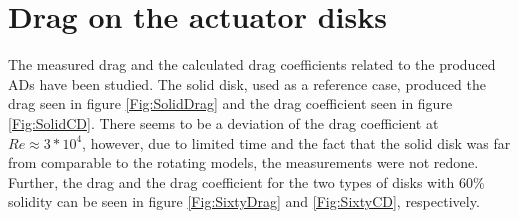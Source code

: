 \section{Drag on the actuator disks}

The measured drag and the calculated drag coefficients related to the produced \gls{AD}s have been studied. The solid disk, used as a reference case, produced the drag seen in figure \ref{Fig:SolidDrag} and the drag coefficient seen in figure \ref{Fig:SolidCD}. There seems to be a deviation of the drag coefficient at $Re \approx 3*10^4$, however, due to limited time and the fact that the solid disk was far from comparable to the rotating models, the measurements were not redone. Further, the drag and the drag coefficient for the two types of disks with 60\% solidity can be seen in figure \ref{Fig:SixtyDrag} and \ref{Fig:SixtyCD}, respectively. 




